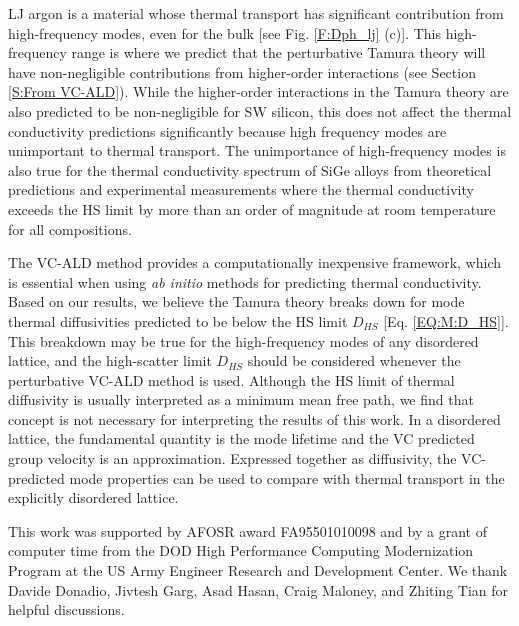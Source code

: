 \documentclass[aps,prb,onecolumn,preprint,footinbib,superscriptaddress,amsmath,amssymb,floatfix]{revtex4}
\begin{document}
LJ argon is a material whose thermal transport has significant 
contribution from high-frequency modes, even for the bulk 
[see Fig. \ref{F:Dph_lj} (c)]. 
This high-frequency range is where we predict that the 
perturbative Tamura theory   
will have non-negligible contributions from higher-order 
interactions (see Section \ref{S:From VC-ALD}). 
While the higher-order interactions in the 
Tamura theory are also predicted to be 
non-negligible for SW silicon, this does not affect the thermal 
conductivity predictions significantly because high frequency modes  
are unimportant to thermal transport. The unimportance of 
high-frequency modes is also 
true for the thermal conductivity spectrum of SiGe alloys 
from theoretical predictions
\cite{abeles_lattice_1963,garg_role_2011,ward_intrinsic_2010} and 
experimental measurements where the thermal conductivity 
exceeds the HS limit by more than
an order of magnitude at room temperature for all compositions.
\cite{cahill_lattice_1988,cahill_thermal_2004,
cahill_thermal_2005,cheaito_experimental_2012}

The VC-ALD method provides a computationally inexpensive framework, 
which is 
essential when using \emph{ab initio} 
methods for predicting thermal conductivity.
\cite{ward_intrinsic_2010,lindsay_thermal_2012,
garg_role_2011,
shiga_microscopic_2012,tian_phonon_2012,
shiomi_thermal_2011,esfarjani_heat_2011,
li_thermal_2012,luckyanova_coherent_2012} Based on our results, 
we believe the Tamura theory breaks down for mode thermal 
diffusivities predicted to be below the HS limit $D_{HS}$ 
[Eq. \eqref{EQ:M:D_HS}]. 
This breakdown may be true for the high-frequency modes of any 
disordered lattice,\cite{sheng_heat_1991} 
and the high-scatter limit $D_{HS}$ should be 
considered whenever the perturbative VC-ALD method is used.
Although the HS limit of thermal 
diffusivity is usually interpreted as a minimum mean free path,
\cite{kittel_interpretation_1949,graebner_phonon_1986,
cahill_lattice_1988,sheng_heat_1991} 
we find that concept is not necessary for interpreting the results 
of this work. In a disordered lattice, the fundamental quantity is 
the mode lifetime\cite{taraskin_determination_1999} and the 
VC predicted group velocity is an approximation. Expressed together as 
diffusivity, the VC-predicted mode properties can be used to 
compare with thermal transport in the explicitly disordered lattice.

\begin{acknowledgements}
This work was supported by AFOSR award FA95501010098 and by a grant 
of computer time from the DOD 
High Performance Computing Modernization Program at the US Army Engineer 
Research and Development Center. 
We thank Davide Donadio, Jivtesh Garg, Asad Hasan, Craig Maloney, 
and Zhiting Tian for helpful discussions.
\end{acknowledgements}
\end{document}
